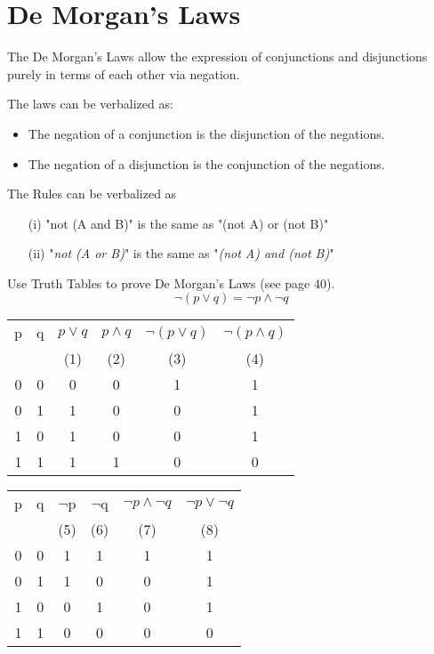 \documentclass[MASTER.tex]{subfiles}
\begin{document}
\section{De Morgan's Laws}
The De Morgan's Laws allow the expression of conjunctions and disjunctions purely in terms of each other via negation.


The laws can be verbalized as:
\begin{itemize}
\item The negation of a conjunction is the disjunction of the negations.
\item The negation of a disjunction is the conjunction of the negations.
\end{itemize}
The Rules can be verbalized as 

\begin{itemize}
\item[(i)]"not (A and B)" is the same as "(not A) or (not B)"

\item[(ii)] "\textit{not (A or B)}" is the same as "\textit{(not A) and (not B)}"
\end{itemize}
Use Truth Tables to prove De Morgan's Laws (see page 40).
\[  \neg (p \vee q) = \neg p \wedge \neg q\]
\begin{center}
\begin{tabular}{|c|c||c|c|c|c|}
  \hline
p	&	q	&	$ p \vee q$	&	$ p \wedge q$&	$\neg (p \vee q)$	&	$\neg (p \wedge q)$\\
	&		&	(1)	&	(2)	&	(3)	&	(4)	\\ \hline
0	&	0	&	0	&	0	&	1	&	1 \\
0	&	1	&	1	&	0	&	0	&	1\\
1	&	0	&	1	&	0	&	0	&	1\\
1	&	1	&	1	&	1	&	0	&	0\\
  \hline
\end{tabular}
\end{center}
\begin{center}
\begin{tabular}{|c|c||c|c|c|c|}
  \hline
p	&	q	&	$\neg$p	&	$\neg$q	&	$\neg p \wedge \neg q$	&	$\neg p \vee \neg q$ \\ 
	&		&	(5)	&	(6)	&	(7)	&	(8)	\\
\hline
0	&	0	&	1	&	1	&	1	&	1	\\
0	&	1	&	1	&	0	&	0	&	1	\\
1	&	0	&	0	&	1	&	0	&	1	\\
1	&	1	&	0	&	0	&	0	&	0	\\
  \hline
\end{tabular}
\end{center}
\end{document}
